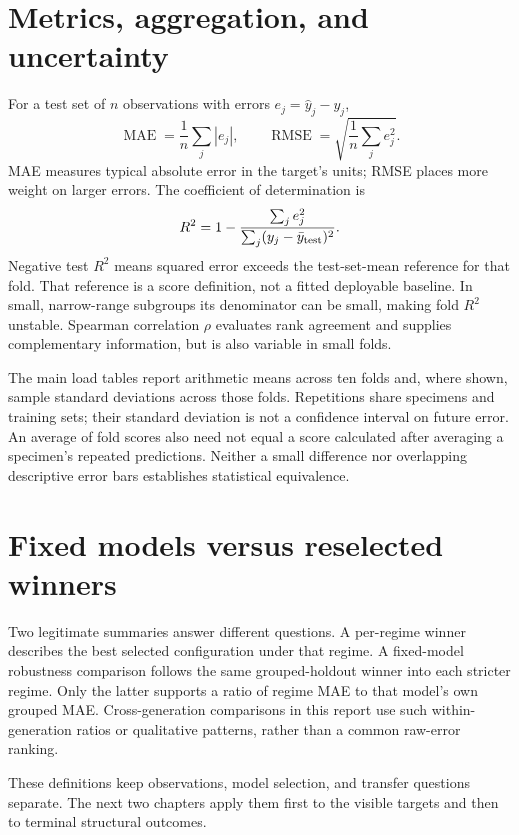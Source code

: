 \section{Metrics, aggregation, and uncertainty}\label{sec:metrics}
For a test set of $n$ observations with errors $e_j=\widehat y_j-y_j$,
\begin{equation}
\operatorname{MAE}=\frac{1}{n}\sum_j |e_j|,\qquad
\operatorname{RMSE}=\sqrt{\frac{1}{n}\sum_j e_j^2}.
\end{equation}
MAE measures typical absolute error in the target's units; RMSE places more weight on larger errors. The coefficient of determination is
\begin{equation}
R^2=1-\frac{\sum_j e_j^2}{\sum_j(y_j-\bar y_{\rm test})^2}.
\end{equation}
Negative test $R^2$ means squared error exceeds the test-set-mean reference for that fold. That reference is a score definition, not a fitted deployable baseline. In small, narrow-range subgroups its denominator can be small, making fold $R^2$ unstable. Spearman correlation $\rho$ evaluates rank agreement and supplies complementary information, but is also variable in small folds.

The main load tables report arithmetic means across ten folds and, where shown, sample standard deviations across those folds. Repetitions share specimens and training sets; their standard deviation is not a confidence interval on future error. An average of fold scores also need not equal a score calculated after averaging a specimen's repeated predictions. Neither a small difference nor overlapping descriptive error bars establishes statistical equivalence.

\section{Fixed models versus reselected winners}
Two legitimate summaries answer different questions. A per-regime winner describes the best selected configuration under that regime. A fixed-model robustness comparison follows the same grouped-holdout winner into each stricter regime. Only the latter supports a ratio of regime MAE to that model's own grouped MAE. Cross-generation comparisons in this report use such within-generation ratios or qualitative patterns, rather than a common raw-error ranking.

These definitions keep observations, model selection, and transfer questions separate. The next two chapters apply them first to the visible targets and then to terminal structural outcomes.
